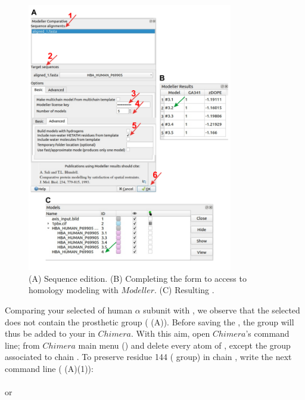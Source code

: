   \begin{figure}[H]
  \centering 
  \captionsetup{width=.7\linewidth} 
  \includegraphics[width=0.80\textwidth]{Images/Fig15}
  \caption{(A) Sequence edition. (B) Completing the form to access to homology modeling with $Modeller$. (C) Resulting .}
  \label{fig:modeller}
  \end{figure}
 
 Comparing your selected  of human  $\alpha$ subunit with  , we observe that the selected   does not contain the  prosthetic group ( (A)). Before saving the , the   group will thus be added to your  in $Chimera$. With this aim, open $Chimera$'s command line; from $Chimera$ main menu () and delete every atom of  , except the  group associated to chain . To preserve residue 144 ( group) in chain , write the next command line ( (A)(1)):\\ 
 
 \\ or\\
 \\ \\ \\
 
